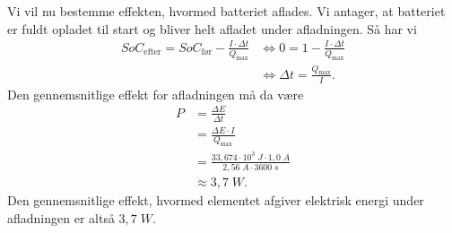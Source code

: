 \documentclass{report}
\begin{document}
Vi vil nu bestemme effekten, hvormed batteriet aflades.
Vi antager, at batteriet er fuldt opladet til start og bliver helt afladet under afladningen.
Så har vi
\begin{equation*}
\begin{split}
  SoC _{\text{efter} }= SoC _{\text{før} } - \frac{I \cdot \Delta t}{Q _{\text{max} }} &\iff 0=1-\frac{I \cdot \Delta t}{Q _{\text{max} }}\\
  &\iff \Delta t = \frac{Q _{\text{max} }}{I}.
\end{split}
\end{equation*}
Den gennemsnitlige effekt for afladningen må da være
\begin{equation*}
\begin{split}
  P &= \frac{\Delta E}{\Delta t} \\
  &=\frac{\Delta E \cdot I}{Q _{\text{max} }}\\
  &=\frac{33,674 \cdot 10^3 \;\unit{J} \cdot 1,0 \;\unit{A} }{2,56 \;\unit{A} \cdot 3600 \;\unit{s} } \\
  &\approx 3,7 \;\unit{W}.
\end{split}
\end{equation*}
Den gennemsnitlige effekt, hvormed elementet afgiver elektrisk energi under afladningen er altså $3,7 \;\unit{W} $.
\end{document}

